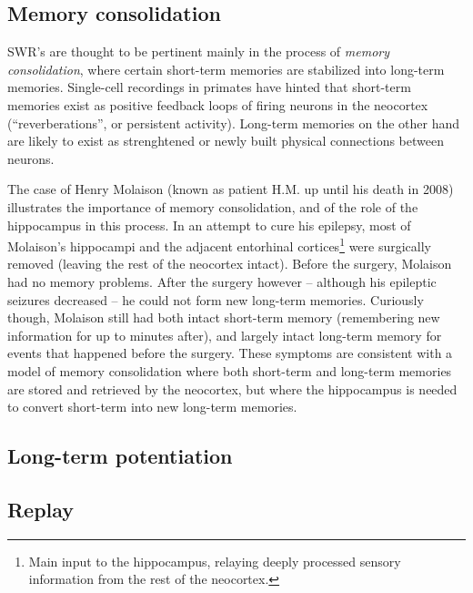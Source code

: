 \subsection{Memory consolidation}

SWR's are thought to be pertinent mainly in the process of \emph{memory consolidation}, where certain short-term memories are stabilized into long-term memories. Single-cell recordings in primates have hinted that short-term memories exist as positive feedback loops of firing neurons in the neocortex (``reverberations'', or persistent activity). Long-term memories on the other hand are likely to exist as strenghtened or newly built physical connections between neurons. \cite{Kandel2013,Bear2015}

The case of Henry Molaison (known as patient H.M. up until his death in 2008) illustrates the importance of memory consolidation, and of the role of the hippocampus in this process. In an attempt to cure his epilepsy, most of Molaison's hippocampi and the adjacent entorhinal cortices\footnote{Main input to the hippocampus, relaying deeply processed sensory information from the rest of the neocortex.} were surgically removed (leaving the rest of the neocortex intact). Before the surgery, Molaison had no memory problems. After the surgery however -- although his epileptic seizures decreased -- he could not form new long-term memories.\footnotemark{} Curiously though, Molaison still had both intact short-term memory (remembering new information for up to minutes after), and largely intact long-term memory for events that happened before the surgery. These symptoms are consistent with a model of memory consolidation where both short-term and long-term memories are stored and retrieved by the neocortex, but where the hippocampus is needed to convert short-term into new long-term memories. \cite{Kandel2013}





\subsection{Long-term potentiation}





\subsection{Replay}

